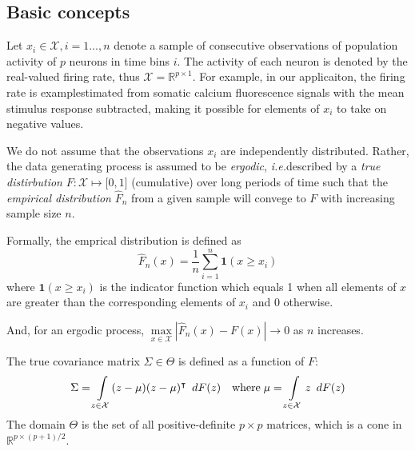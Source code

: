 \subsection{Basic concepts}
Let $x_i \in \mathcal X, i=1\ldots,n$ denote a sample of consecutive observations of population activity of $p$ neurons in time bins $i$.  
The activity of each neuron is denoted by the real-valued firing rate, thus  $\mathcal X = \mathbb R^{p\times 1}$.  
For example, in our applicaiton, the firing rate is examplestimated from somatic calcium fluorescence signals with the mean stimulus response subtracted, making it possible for elements of $x_i$ to take on negative values. 

We do not assume that the observations $x_i$ are independently distributed. Rather, the data generating process is assumed to be \emph{ergodic}, \emph{i.e.}\;described by a \emph{true distirbution} $F: \mathcal X \mapsto  \mathbb [0, 1]$ (cumulative) over long periods of time such that the \emph{empirical distribution} $\hat F_n$ from a given sample will convege to $F$ with increasing sample size $n$.

Formally, the emprical distribution is defined as 
\begin{equation}
\hat F_n(x) = \frac 1 n \sum\limits_{i=1}^n \mathbf{1}(x \ge x_i)
\end{equation}
where $\mathbf 1(x \ge x_i)$ is the indicator function which equals 1 when all elements of $x$ are greater than the corresponding elements of $x_i$ and 0 otherwise. 

And, for an ergodic process, $\max\limits_{x\in\mathcal X} \left|\hat F_n(x) - F(x)\right| \to 0$ as $n$ increases.

The true covariance matrix $\Sigma \in \Theta$ is defined as a function of $F$:
\begin{equation}
\Sigma = \int\limits_{z\in\mathcal X} (z - \mu)(z - \mu)^\intercal \mathop{}\,d F(z)
\quad\mbox{where}\;
\mu = \int\limits_{z\in\mathcal X} z \mathop{}\,d F(z)
\end{equation}
The domain $\Theta$ is the set of all positive-definite $p\times p$ matrices, which is a cone in $\mathbb R^{p\times(p+1)/2}$.

